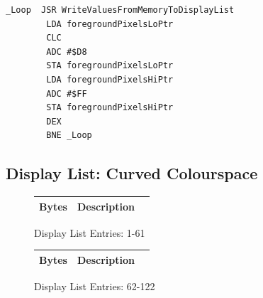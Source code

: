 \begin{lstlisting}
_Loop  JSR WriteValuesFromMemoryToDisplayList
        LDA foregroundPixelsLoPtr
        CLC 
        ADC #$D8
        STA foregroundPixelsLoPtr
        LDA foregroundPixelsHiPtr
        ADC #$FF
        STA foregroundPixelsHiPtr
        DEX 
        BNE _Loop
\end{lstlisting}
%
%
\subsection*{Display List: Curved Colourspace}
\vspace{-0.5cm}
\begin{minipage}[b]{0.31\linewidth}
  \begin{figure}[H]
    {
      \setlength{\tabcolsep}{3.0pt}
      \setlength\cmidrulewidth{\heavyrulewidth} %
      \begin{adjustbox}{height=8.5cm}

        \begin{tabular}{lll}
          \toprule
          Bytes       & Description                                                         \\
          \midrule
          
        \end{tabular}

      \end{adjustbox}

    }\caption*{Display List Entries: 1-61}
  \end{figure}
\end{minipage}
\hspace{0.1cm}
\begin{minipage}[b]{0.31\linewidth}
  \begin{figure}[H]
    {
      \setlength{\tabcolsep}{3.0pt}
      \setlength\cmidrulewidth{\heavyrulewidth} %
      \begin{adjustbox}{height=8.5cm}

        \begin{tabular}{lll}
          \toprule
          Bytes       & Description                                                         \\
          \midrule
        \end{tabular}

      \end{adjustbox}

    }\caption*{Display List Entries: 62-122}
  \end{figure}
\end{minipage}

